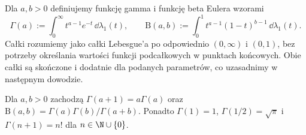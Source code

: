 \begin{definicja}
Dla $a,b>0$ definiujemy funkcję gamma i funkcję beta Eulera wzorami
\[
\Gamma(a):=\int_0^\infty t^{a-1}e^{-t}\,\dd\lambda_1(t),
\qquad
\mathrm B(a,b):=\int_0^1 t^{a-1}(1-t)^{b-1}\,\dd\lambda_1(t).
\]
Całki rozumiemy jako całki Lebesgue'a po odpowiednio
$(0,\infty)$ i $(0,1)$, bez potrzeby określania wartości
funkcji podcałkowych w punktach końcowych.
Obie całki są skończone i dodatnie dla podanych parametrów,
co uzasadnimy w następnym dowodzie.
\end{definicja}

\begin{lemat}
Dla $a,b>0$ zachodzą
$\Gamma(a+1)=a\Gamma(a)$ oraz
$\mathrm B(a,b)=\Gamma(a)\Gamma(b)/\Gamma(a+b)$.
Ponadto $\Gamma(1)=1$, $\Gamma(1/2)=\sqrt\pi$
i $\Gamma(n+1)=n!$ dla $n\in\N\cup\{0\}$.
\end{lemat}
